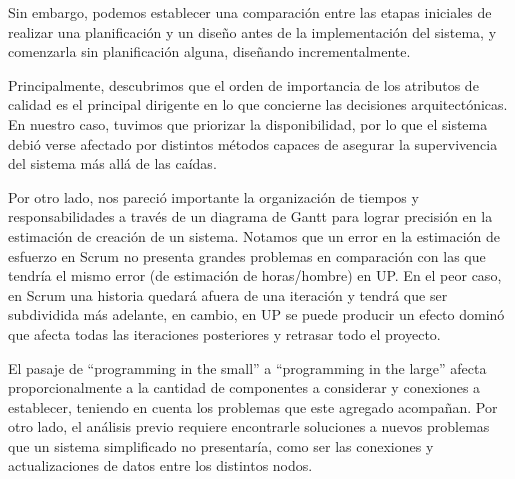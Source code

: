 \documentclass[a4paper, 10pt, twoside]{article}
\begin{document}
Sin embargo, podemos establecer una comparación entre las etapas iniciales de realizar una planificación y un diseño antes de la implementación del sistema, y comenzarla sin planificación alguna, diseñando incrementalmente.

Principalmente, descubrimos que el orden de importancia de los atributos de calidad es el principal dirigente en lo que concierne las decisiones arquitectónicas. En nuestro caso, tuvimos que priorizar la disponibilidad, por lo que el sistema debió verse afectado por distintos métodos capaces de asegurar la supervivencia del sistema más allá de las caídas.

Por otro lado, nos pareció importante la organización de tiempos y responsabilidades a través de un diagrama de Gantt para lograr precisión en la estimación de creación de un sistema. Notamos que un error en la estimación de esfuerzo en Scrum no presenta grandes problemas en comparación con las que tendría el mismo error (de estimación de horas/hombre) en UP. En el peor caso, en Scrum una historia quedará afuera de una iteración y tendrá que ser subdividida más adelante, en cambio, en UP se puede producir un efecto dominó que afecta todas las iteraciones posteriores y retrasar todo el proyecto.

El pasaje de ``programming in the small'' a ``programming in the large'' afecta proporcionalmente a la cantidad de componentes a considerar y conexiones a establecer, teniendo en cuenta los problemas que este agregado acompañan. Por otro lado, el análisis previo requiere encontrarle soluciones a nuevos problemas que un sistema simplificado no presentaría, como ser las conexiones y actualizaciones de datos entre los distintos nodos.
\end{document}

